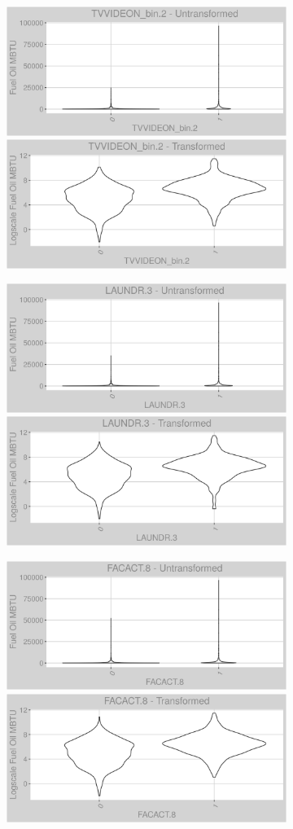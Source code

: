 \FloatBarrier
\newpage
\begin{figure}
\centering
\begin{subfigure}{1\textwidth}
\centering
\includegraphics[width=.49\textwidth, height=0.3\textheight]{Images/fuel_oil_var_original_9.png}
\includegraphics[width=.49\textwidth, height=0.3\textheight]{Images/fuel_oil_var_transformed_9.png}
\end{subfigure}
\begin{subfigure}{1\textwidth}
\centering
\includegraphics[width=.49\textwidth, height=0.3\textheight]{Images/fuel_oil_var_original_10.png}
\includegraphics[width=.49\textwidth, height=0.3\textheight]{Images/fuel_oil_var_transformed_10.png}
\end{subfigure}
\begin{subfigure}{1\textwidth}
\centering
\includegraphics[width=.49\textwidth, height=0.3\textheight]{Images/fuel_oil_var_original_11.png}
\includegraphics[width=.49\textwidth, height=0.3\textheight]{Images/fuel_oil_var_transformed_11.png}
\end{subfigure}
\end{figure}
